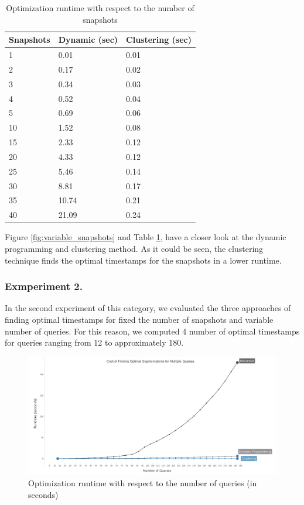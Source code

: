 			\begin{center}
			\begin{table}
				\centering
				\caption{Optimization runtime with respect to the number of snapshots}
				\label {table:variable_snapshots_2}
				\begin{tabular}{p{2cm}p{3cm}p{3cm}}
					\hline
					Snapshots  & Dynamic (sec) & Clustering (sec)\\ \hline
					1 &   0.01 & 0.01 \\  
					2 &  0.17  & 0.02  \\
					3 &  0.34  & 0.03  \\
					4 & 0.52  & 0.04  \\
					5 &  0.69  & 0.06 \\
					10 &  1.52  & 0.08  \\
					15 & 2.33  & 0.12  \\ 
					20 & 4.33  & 0.12  \\ 
					25 & 5.46  & 0.14  \\ 
					30 & 8.81  & 0.17  \\
					35 & 10.74  & 0.21  \\
					40 & 21.09  & 0.24  \\\hline
				\end{tabular}
			\end{table}
			\end{center}
			Figure \ref{fig:variable_snapshots} and Table \ref{table:variable_snapshots_2}, have a closer look at the dynamic programming and clustering method. As it could be seen, the clustering technique finds the optimal timestamps for the snapshots in a lower runtime.

			\subsubsection {Exmperiment 2.} \label{sec:experiment_2}

			In the second experiment of this category, we evaluated the three approaches of finding optimal timestamps for fixed the number of snapshots and variable number of queries. For this reason, we computed 4 number of optimal timestamps for queries ranging from 12 to approximately 180. 

			\begin{figure}
				\centering
				\includegraphics[width=\textwidth]{figs/multi_query.jpg}
				\caption{Optimization runtime with respect to the number of queries (in seconds)}
				\label{fig:variable_queries}
			\end{figure} 


